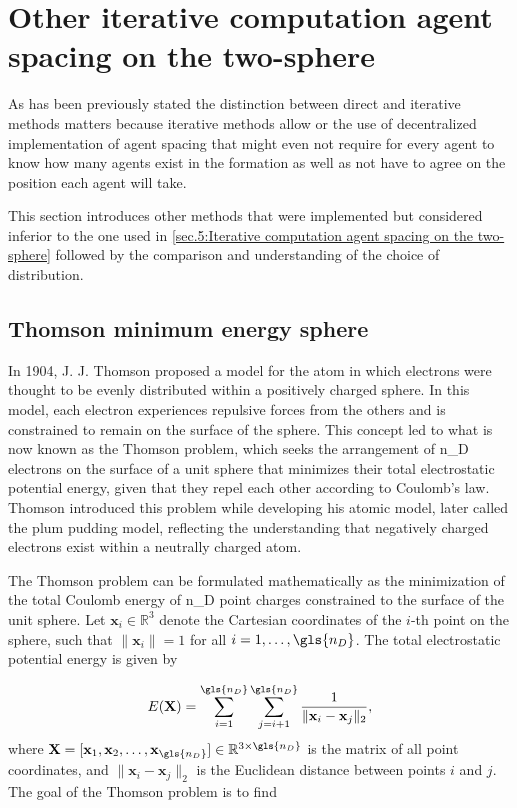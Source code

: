 \section{Other iterative computation agent spacing on the two-sphere} \label{annex:Other iterative computation agent spacing on the two-sphere}

As has been previously stated the distinction between direct and iterative methods matters because iterative methods allow or the use of decentralized implementation of agent spacing that might even not require for every agent to know how many agents exist in the formation as well as not have to agree on the position each agent will take.

This section introduces other methods that were implemented but considered inferior to the one used in \ref{sec.5:Iterative computation agent spacing on the two-sphere} followed by the comparison and understanding of the choice of distribution.

\subsection{Thomson minimum energy sphere} \label{annex:Thomson minimum energy sphere}

In 1904, J. J. Thomson proposed a model for the atom in which electrons were thought to be evenly distributed within a positively charged sphere. In this model, each electron experiences repulsive forces from the others and is constrained to remain on the surface of the sphere. This concept led to what is now known as the Thomson problem, which seeks the arrangement of \gls{n_D} electrons on the surface of a unit sphere that minimizes their total electrostatic potential energy, given that they repel each other according to Coulomb's law. Thomson introduced this problem while developing his atomic model, later called the plum pudding model, reflecting the understanding that negatively charged electrons exist within a neutrally charged atom.\cite{thomson_min_energy_sphere}

The Thomson problem can be formulated mathematically as the minimization of the total Coulomb energy of \gls{n_D} point charges constrained to the surface of the unit sphere. Let $\mathbf{x}_i \in \mathbb{R}^3$ denote the Cartesian coordinates of the $i$-th point on the sphere, such that $\|\mathbf{x}_i\| = 1$ for all $i = 1, \dots, \gls{n_D}$. The total electrostatic potential energy is given by

\begin{equation}
E(\mathbf{X}) = \sum_{i=1}^{\gls{n_D}} \sum_{j=i+1}^{\gls{n_D}} \frac{1}{\|\mathbf{x}_i - \mathbf{x}_j\|_2},
\end{equation}
where $\mathbf{X} = [\mathbf{x}_1, \mathbf{x}_2, \dots, \mathbf{x}_{\gls{n_D}}] \in \mathbb{R}^{3 \times \gls{n_D}}$ is the matrix of all point coordinates, and $\|\mathbf{x}_i - \mathbf{x}_j\|_2$ is the Euclidean distance between points $i$ and $j$. The goal of the Thomson problem is to find

